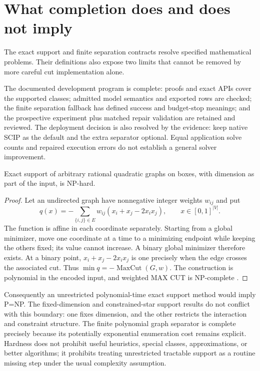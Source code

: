 \section{What completion does and does not imply}\label{sec:frontier}

The exact support and finite separation contracts resolve specified
mathematical problems. Their definitions also expose two limits that
cannot be removed by more careful cut implementation alone.

The documented development program is complete: proofs and exact APIs
cover the supported classes; admitted model semantics and exported rows
are checked; the finite separation fallback has defined success and
budget-stop meanings; and the prospective experiment plus matched repair
validation are retained and reviewed. The deployment decision is also
resolved by the evidence: keep native SCIP as the default and the extra
separator optional. Equal application solve counts and repaired execution
errors do not establish a general solver improvement.

\begin{proposition}\label{prop:hardness}
Exact support of arbitrary rational quadratic graphs on boxes, with
dimension as part of the input, is NP-hard.
\end{proposition}
\begin{proof}
Let an undirected graph have nonnegative integer weights $w_{ij}$ and put
\[
q(x)=-\sum_{\{i,j\}\in E}w_{ij}(x_i+x_j-2x_ix_j),
\qquad x\in[0,1]^{|V|}.
\]
The function is affine in each coordinate separately. Starting from a
global minimizer, move one coordinate at a time to a minimizing endpoint
while keeping the others fixed; its value cannot increase. A binary
global minimizer therefore exists. At a binary point,
$x_i+x_j-2x_ix_j$ is one precisely when the edge crosses the associated
cut. Thus $\min q=-\operatorname{MaxCut}(G,w)$. The construction is
polynomial in the encoded input, and weighted MAX CUT is NP-complete
\cite{Karp1972}.
\end{proof}

Consequently an unrestricted polynomial-time exact support method would
imply P=NP. The fixed-dimension and constrained-star support results do
not conflict with this boundary: one fixes dimension, and the other
restricts the interaction and constraint structure. The finite polynomial
graph separator is complete precisely because its potentially exponential
enumeration cost remains explicit. Hardness does not prohibit useful
heuristics, special classes, approximations, or better algorithms; it
prohibits treating unrestricted tractable support as a routine missing
step under the usual complexity assumption.

